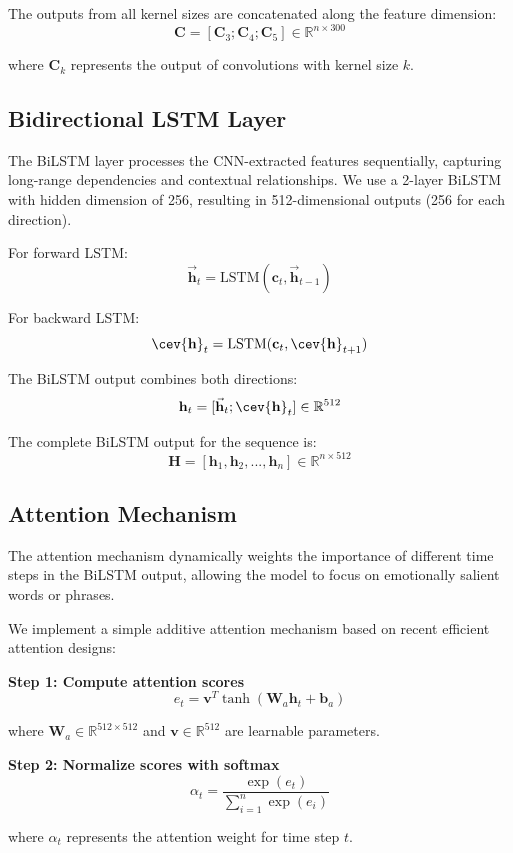 \documentclass[12pt,a4paper]{article}
\begin{document}
The outputs from all kernel sizes are concatenated along the feature dimension:
$$\mathbf{C} = [\mathbf{C}_3; \mathbf{C}_4; \mathbf{C}_5] \in \mathbb{R}^{n \times 300}$$

where $\mathbf{C}_k$ represents the output of convolutions with kernel size $k$.

\subsection{Bidirectional LSTM Layer}

The BiLSTM layer processes the CNN-extracted features sequentially, capturing long-range dependencies and contextual relationships. We use a 2-layer BiLSTM with hidden dimension of 256, resulting in 512-dimensional outputs (256 for each direction).

For forward LSTM:
$$\vec{\mathbf{h}}_t = \text{LSTM}(\mathbf{c}_t, \vec{\mathbf{h}}_{t-1})$$

For backward LSTM:
$$\cev{\mathbf{h}}_t = \text{LSTM}(\mathbf{c}_t, \cev{\mathbf{h}}_{t+1})$$

The BiLSTM output combines both directions:
$$\mathbf{h}_t = [\vec{\mathbf{h}}_t; \cev{\mathbf{h}}_t] \in \mathbb{R}^{512}$$

The complete BiLSTM output for the sequence is:
$$\mathbf{H} = [\mathbf{h}_1, \mathbf{h}_2, ..., \mathbf{h}_n] \in \mathbb{R}^{n \times 512}$$

\subsection{Attention Mechanism}

The attention mechanism dynamically weights the importance of different time steps in the BiLSTM output, allowing the model to focus on emotionally salient words or phrases.

We implement a simple additive attention mechanism based on recent efficient attention designs:

\textbf{Step 1: Compute attention scores}
$$e_t = \mathbf{v}^T \tanh(\mathbf{W}_a \mathbf{h}_t + \mathbf{b}_a)$$

where $\mathbf{W}_a \in \mathbb{R}^{512 \times 512}$ and $\mathbf{v} \in \mathbb{R}^{512}$ are learnable parameters.

\textbf{Step 2: Normalize scores with softmax}
$$\alpha_t = \frac{\exp(e_t)}{\sum_{i=1}^{n} \exp(e_i)}$$

where $\alpha_t$ represents the attention weight for time step $t$.
\end{document}

